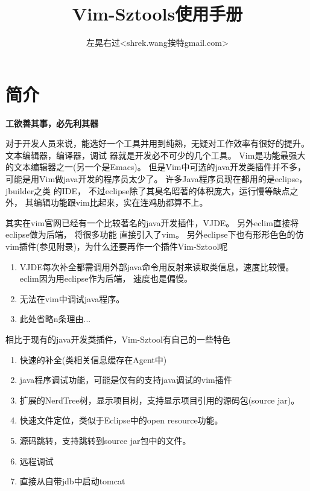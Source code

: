 \documentclass[oneside,openany]{book}
\title{Vim-Sztools使用手册}
\author{左晃右过<shrek.wang挨特gmail.com>}
\begin{document}
\maketitle

\chapter{简介}

  \begin{center}
    \large\textbf{工欲善其事，必先利其器}
  \end{center}

  对于开发人员来说，能选好一个工具并用到纯熟，无疑对工作效率有很好的提升。 文本编辑器，编译器，调试
器就是开发必不可少的几个工具。  Vim是功能最强大的文本编辑器之一(另一个是Emacs)。 
但是Vim中可选的java开发类插件并不多， 可能是用Vim做java开发的程序员太少了。 许多Java程序员现在都用的是eclipse，jbuilder之类
的IDE， 不过eclipse除了其臭名昭著的体积庞大，运行慢等缺点之外， 其编辑功能跟vim比起来，实在连鸡肋都算不上。 

  其实在vim官网已经有一个比较著名的java开发插件，VJDE。 另外eclim直接将eclipse做为后端， 将很多功能
直接引入了vim。 另外eclipse下也有形形色色的仿vim插件(参见附录)，为什么还要再作一个插件Vim-Sztool呢
  
  \begin{enumerate}
    \item VJDE每次补全都需调用外部java命令用反射来读取类信息，速度比较慢。eclim因为用eclipse作为后端， 速度也是偏慢。
    \item 无法在vim中调试java程序。
    \item 此处省略n条理由...
  \end{enumerate}

  相比于现有的java开发类插件，Vim-Sztool有自己的一些特色
  \begin{enumerate}
    \item 快速的补全(类相关信息缓存在Agent中)
    \item java程序调试功能，可能是仅有的支持java调试的vim插件
    \item 扩展的NerdTree树，显示项目树，支持显示项目引用的源码包(source jar)。
    \item 快速文件定位，类似于Eclipse中的open resource功能。
    \item 源码跳转，支持跳转到source jar包中的文件。
    \item 远程调试
    \item 直接从自带jdb中启动tomcat
  \end{enumerate}
\end{document}
